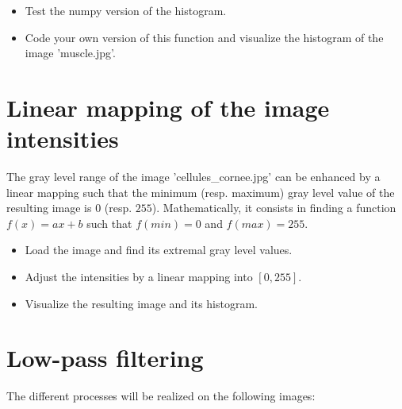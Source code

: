 \begin{qbox}
\begin{itemize}
 \item Test the numpy version of the histogram.
 \item Code your own version of this function and visualize the histogram of the image 'muscle.jpg'.
\end{itemize}

\end{qbox}



\vspace*{-8pt}
\section{Linear mapping of the image in\-ten\-si\-ties}

The gray level range of the image 'cellules\_cornee.jpg' can be enhanced by a linear map\-ping such that the minimum (resp. maximum) gray level value of the resulting image is $0$ (resp. $255$). Mathematical\-ly, it consists in finding a function $f(x)=ax+b$ such that 
$f(min)=0$ and $f(max)=255$.

\begin{qbox}
\begin{itemize}
\item Load the image and find its extremal gray level values.
\item Adjust the intensities by a linear mapping into $[0, 255]$.

\item Visualize the resulting image and its histogram.
\end{itemize}
\end{qbox}




\section{Low-pass filtering}

The different processes will be realized on the following images:
{
	\makeatletter
	\renewcommand\fs@ruled{\def\@fs@cfont{\bfseries}\let\@fs@capt\floatc@ruled
		\def\@fs@pre{\hrule height.8pt depth0pt \kern2pt}%
		\def\@fs@post{\kern2pt\hrule\relax}%
		\def\@fs@mid{\vskip2pt}%
		\let\@fs@iftopcapt\iftrue}
	\makeatother
\begin{figure}[H]
\centering
{}
\hfill
{}
\vspace*{-10pt}
\end{figure}
}

